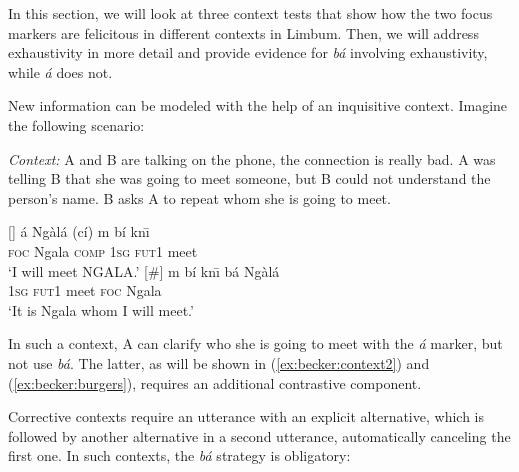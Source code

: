 \documentclass[output=paper,
modfonts
]{langscibook}
\begin{document}
\noindent
In this section, we will look at three context tests that show how the two focus markers are felicitous in different contexts in Limbum. Then, we will address exhaustivity in more detail and provide evidence for \textit{bá} involving exhaustivity, while \textit{á} does not.

New information can be modeled with the help of an inquisitive context. Imagine the following scenario:

\begin{exe}
\ex
\textit{Context:} A and B are talking on the phone, the connection is really bad. A was telling B that she was going to meet someone, but B could not understand the person's name. B asks A to repeat whom she is going to meet.\label{ex:becker:context1}
\begin{xlist}
[]{
\gll á Ngàlá  (cí) m bí kn\={\i} \\
\textsc{foc} Ngala \textsc{comp} \textsc{1sg} \textsc{fut1} meet \\
\glt `I will meet NGALA.'}
[\#]{
\gll m bí kn\={\i} bá Ngàlá\\
\textsc{1sg} \textsc{fut1} meet \textsc{foc} Ngala \\
\glt `It is Ngala whom I will meet.'}
\end{xlist}
\end{exe}

\noindent 
In such a context, A can clarify who she is going to meet with the \textit{á} marker, but not use \textit{bá}. The latter, as will be shown in (\ref{ex:becker:context2}) and (\ref{ex:becker:burgers}), requires an additional contrastive component.

Corrective contexts require an utterance with an explicit alternative, which is followed by another alternative in a second utterance, automatically canceling the first one. In such contexts, the \textit{bá} strategy is obligatory:
\end{document}
